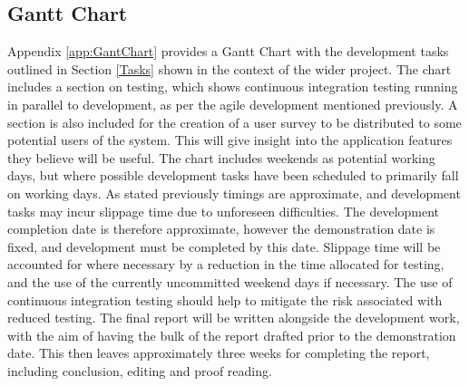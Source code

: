 \documentclass[titlepage,hidelinks,10pt]{article}
\begin{document}
\subsection{Gantt Chart}\label{GanttChart}
Appendix \ref{app:GantChart} provides a Gantt Chart with the development tasks outlined in Section \ref{Tasks} shown in the context of the wider project. The chart includes a section on testing, which shows continuous integration testing running in parallel to development, as per the agile development mentioned previously. A section is also included for the creation of a user survey to be distributed to some potential users of the system. This will give insight into the application features they believe will be useful. The chart includes weekends as potential working days, but where possible development tasks have been scheduled to primarily fall on working days. As stated previously timings are approximate, and development tasks may incur slippage time due to unforeseen difficulties. The development completion date is therefore approximate, however the demonstration date is fixed, and development must be completed by this date. Slippage time will be accounted for where necessary by a reduction in the time allocated for testing, and the use of the currently uncommitted weekend days if necessary. The use of continuous integration testing should help to mitigate the risk associated with reduced testing. The final report will be written alongside the development work, with the aim of having the bulk of the report drafted prior to the demonstration date. This then leaves approximately three weeks for completing the report, including conclusion, editing and proof reading.
\end{document}
